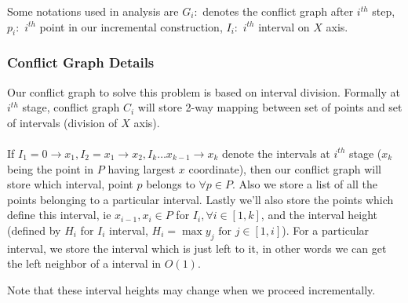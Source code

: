 \documentclass[a4paper]{article}
\begin{document}
Some notations used in analysis are $G_i: $ denotes the conflict graph after $i^{th}$ step, $p_i: $ $i^{th}$ point in our incremental construction, $I_i: $ $i^{th}$ interval on $X$ axis.

\subsubsection*{Conflict Graph Details}
Our conflict graph to solve this problem is based on interval division. Formally at $i^{th}$ stage, conflict graph $C_i$ will store 2-way mapping between set of points and set of intervals (division of $X$ axis). \\ \\ 
If $I_1 = 0\rightarrow x_1, I_2 = x_1 \rightarrow x_2, I_k \ldots x_{k-1} \rightarrow x_{k}$ denote the intervals at $i^{th}$ stage ($x_k$ being the point in $P$ having largest $x$ coordinate), then our conflict graph will store which interval, point $p$ belongs to $\forall p \in P$. Also we store a list of all the points belonging to a particular interval. Lastly we'll also store the points which define this interval, ie $x_{i-1}, x_i\in P$ for $I_i, \forall i \in [1,k]$, and the interval height (defined by $H_{i}$ for $I_i$ interval, $H_i = \max y_j \text{ for } j \in [1,i]$). For a particular interval, we store the interval which is just left to it, in other words we can get the left neighbor of a interval in $O(1)$. 

Note that these interval heights may change when we proceed incrementally.\\ \\
\end{document}
